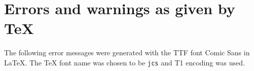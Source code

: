 \documentclass[10pt]{scrartcl}
\begin{document}
\section*{Errors and warnings as given by \TeX}

\begin{minipage}{\textwidth}
The following error messages were generated with the TTF font Comic Sans in \LaTeX{}. The \TeX{} font name was chosen to be \texttt{jcs} and T1 encoding was used.
\end{minipage}

\bigskip

\newlength{\errormsgboxwidth}
\setlength{\errormsgboxwidth}{15cm}
\end{document}
